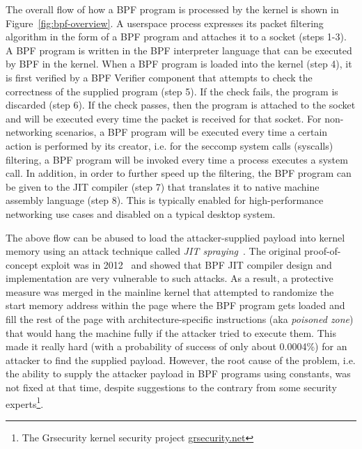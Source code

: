 The overall flow of how a BPF program is processed by the kernel is shown in Figure~\ref{fig:bpf-overview}.  
A userspace process expresses its packet filtering algorithm in the form of a BPF program and attaches it to a socket (steps 1-3). A BPF program is written in the BPF interpreter language that can be executed by BPF in the kernel. When a BPF program is loaded into the kernel (step 4), it is first verified by a BPF Verifier component that attempts to check the correctness of the supplied program (step 5). If the check fails, the program is discarded (step 6). If the check passes, then the program is attached to the socket and will be executed every time the packet is received for that socket. For non-networking scenarios, a BPF program will be executed every time a certain action is performed by its creator, i.e. for the seccomp system calls (syscalls) filtering, a BPF program will be invoked every time a process executes a system call. In addition, in order to further speed up the filtering, the BPF program can be given to the JIT compiler (step 7) that translates it to native machine assembly language (step 8). This is typically enabled for high-performance networking use cases and disabled on a typical desktop system.  

The above flow can be abused to load the attacker-supplied payload into kernel memory using an attack technique called \textit{JIT spraying}~\cite{blazakis2010, bania2010jit}. The original proof-of-concept exploit was in 2012~\cite{mcallister2012attacking} and showed that BPF JIT compiler design and implementation are very vulnerable to such attacks. As a result, a protective measure was merged in the mainline kernel that attempted to randomize the start memory address within the page where the BPF program gets loaded and fill the rest of the page with architecture-specific instructions (aka \textit{poisoned zone}) that would hang the machine fully if the attacker tried to execute them. This made it really hard (with a probability of success of only about 0.0004\%) for an attacker to find the supplied payload. However, the root cause of the problem, i.e. the ability to supply the attacker payload in BPF programs using constants, was not fixed at that time, despite suggestions to the contrary from some security experts\footnote{The Grsecurity kernel security project \url{grsecurity.net}}.

